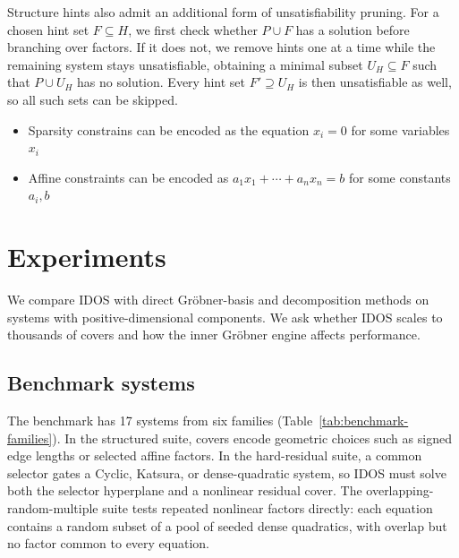 \documentclass[12pt]{article}
\begin{document}
Structure hints also admit an additional form of unsatisfiability pruning.  For a chosen hint set $F \subseteq H$, we first check whether $P \cup F$ has a solution before branching over factors.  If it does not, we remove hints one at a time while the remaining system stays unsatisfiable, obtaining a minimal subset $U_H \subseteq F$ such that $P \cup U_H$ has no solution.  Every hint set $F' \supseteq U_H$ is then unsatisfiable as well, so all such sets can be skipped.

\begin{itemize}
    \item Sparsity constrains can be encoded as the equation $x_i = 0$ for some variables $x_i$
    \item Affine constraints can be encoded as $a_1 x_1 + \cdots + a_n x_n = b$ for some constants $a_i, b$
\end{itemize}

\section*{Experiments}

We compare IDOS with direct Gr\"obner-basis and decomposition methods on
systems with positive-dimensional components.  We ask whether IDOS scales to thousands of
covers and how the inner Gr\"obner engine affects performance.

\subsection*{Benchmark systems}

The benchmark has 17 systems from six families
(Table~\ref{tab:benchmark-families}).  In the structured suite, covers encode
geometric choices such as signed edge lengths or selected affine factors.  In
the hard-residual suite, a common selector gates a Cyclic, Katsura, or
dense-quadratic system, so IDOS must solve both the selector hyperplane and a
nonlinear residual cover.  The overlapping-random-multiple suite tests repeated
nonlinear factors directly: each equation contains a random subset of a pool of
seeded dense quadratics, with overlap but no factor common to every equation.
\end{document}
